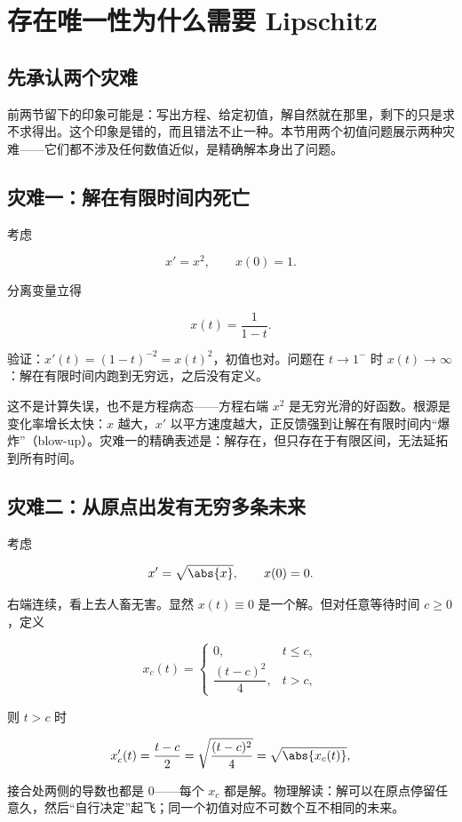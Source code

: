 \section{存在唯一性为什么需要 Lipschitz}

\subsection{先承认两个灾难}

前两节留下的印象可能是：写出方程、给定初值，解自然就在那里，剩下的只是求不求得出。这个印象是错的，而且错法不止一种。本节用两个初值问题展示两种灾难——它们都不涉及任何数值近似，是精确解本身出了问题。

\subsection{灾难一：解在有限时间内死亡}

考虑

\[
x'=x^2,
\qquad
x(0)=1.
\]

分离变量立得

\[
x(t)=\frac{1}{1-t}.
\]

验证：\(x'(t)=(1-t)^{-2}=x(t)^2\)，初值也对。问题在 \(t\to1^{-}\) 时 \(x(t)\to\infty\)：解在有限时间内跑到无穷远，之后没有定义。

这不是计算失误，也不是方程病态——方程右端 \(x^2\) 是无穷光滑的好函数。根源是变化率增长太快：\(x\) 越大，\(x'\) 以平方速度越大，正反馈强到让解在有限时间内``爆炸''（blow-up）。灾难一的精确表述是：解存在，但只存在于有限区间，无法延拓到所有时间。

\subsection{灾难二：从原点出发有无穷多条未来}

考虑

\[
x'=\sqrt{\abs{x}},
\qquad
x(0)=0.
\]

右端连续，看上去人畜无害。显然 \(x(t)\equiv0\) 是一个解。但对任意等待时间 \(c\ge0\)，定义

\[
x_c(t)=
\begin{cases}
0, & t\le c,\\[2mm]
\dfrac{(t-c)^2}{4}, & t>c,
\end{cases}
\]

则 \(t>c\) 时

\[
x_c'(t)=\frac{t-c}{2}=\sqrt{\frac{(t-c)^2}{4}}=\sqrt{\abs{x_c(t)}},
\]

接合处两侧的导数也都是 \(0\)——每个 \(x_c\) 都是解。物理解读：解可以在原点停留任意久，然后``自行决定''起飞；同一个初值对应不可数个互不相同的未来。

